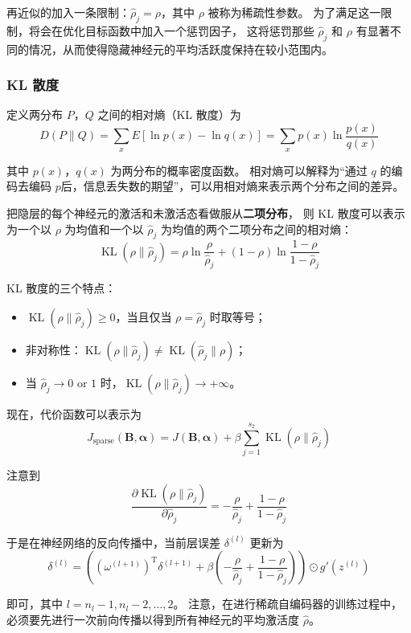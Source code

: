 再近似的加入一条限制：$\hat{\rho}_j = \rho$，其中 $\rho$ 被称为稀疏性参数。
为了满足这一限制，将会在优化目标函数中加入一个惩罚因子，
这将惩罚那些 $\hat{\rho}_j$ 和 $\rho$ 有显著不同的情况，从而使得隐藏神经元的平均活跃度保持在较小范围内。

\subsubsection{KL 散度}
定义两分布 $P$，$Q$ 之间的相对熵（KL 散度）为
\begin{equation}
    D(P\|Q) = \sum_xE\left[\ln p(x) - \ln q(x)\right] = \sum_xp(x) \ln \dfrac{p(x)}{q(x)}
\end{equation}

其中 $p(x)$，$q(x)$ 为两分布的概率密度函数。
相对熵可以解释为“通过 $q$ 的编码去编码 $p$后，信息丢失数的期望”，可以用相对熵来表示两个分布之间的差异。

把隐层的每个神经元的激活和未激活态看做服从\textbf{二项分布}，
则 KL 散度可以表示为一个以 $\rho$ 为均值和一个以 $\hat{\rho}_j$ 为均值的两个二项分布之间的相对熵：
\begin{equation}
    \operatorname{KL}(\rho \| \hat{\rho}_j) = 
    \rho\ln\dfrac{\rho}{\hat{\rho}_j} + (1 - \rho) \ln \dfrac{1 - \rho}{1 - \hat{\rho}_j}
\end{equation}

KL 散度的三个特点：
\begin{itemize}
    \item $\operatorname{KL}(\rho \| \hat{\rho}_j) \geq 0$，当且仅当 $\rho = \hat{\rho}_j$ 时取等号；
    \item 非对称性：$\operatorname{KL}(\rho\|\hat{\rho}_j) \neq \operatorname{KL}(\hat{\rho}_j\|\rho)$；
    \item 当 $\hat\rho_j \to 0 \text{ or } 1$ 时，$\operatorname{KL}(\rho \| \hat\rho_j) \to +\infty$。
\end{itemize}

现在，代价函数可以表示为
\begin{equation}
    J_{\text{sparse}}(\mathbf B, \boldsymbol{\alpha}) 
    = J(\mathbf B, \boldsymbol{\alpha}) + \beta\sum_{j=1}^{s_2}\operatorname{KL}(\rho\|\hat{\rho}_j)
\end{equation}

注意到
\begin{equation}
    \dfrac{\partial \operatorname{KL}(\rho \| \hat{\rho}_j)}{\partial \hat{\rho}_j} 
    = -\dfrac{\rho}{\hat{\rho}_j} + \dfrac{1 - \rho}{1 - \hat{\rho}_j}
\end{equation}

于是在神经网络的反向传播中，当前层误差 $\delta^{(l)}$ 更新为
\begin{equation}
    \delta^{(l)} = \left((\omega^{(l+1)})^\mathrm{T}\delta^{(l+1)} 
    + \beta\left(-\dfrac{\rho}{\hat{\rho}_j} + \dfrac{1 - \rho}{1 - \hat{\rho}_j}\right)\right) 
    \odot g'\left(z^{(l)}\right)
\end{equation}

即可，其中 $l = n_l - 1, n_l - 2, \dots, 2$。
注意，在进行稀疏自编码器的训练过程中，必须要先进行一次前向传播以得到所有神经元的平均激活度 $\hat{\rho}$。